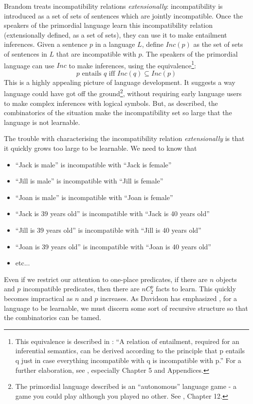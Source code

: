 Brandom treats incompatibility relations \emph{extensionally}: incompatibility is introduced as a set of sets of sentences which are jointly incompatible.
Once the speakers of the primordial language learn this incompatibility relation (extensionally defined, as a set of sets), they can use it to make entailment inferences.
Given a sentence $p$ in a language $L$, define $Inc(p)$ as the set of sets of sentences in $L$ that are incompatible with $p$.
The speakers of the primordial language can use $Inc$ to make inferences, using the equivalence\footnote{This equivalence is described in \cite{brandom2}: ``A relation of entailment, required for an inferential semantics, can be derived according to the principle that  p entails q just in case everything incompatible with q is incompatible with p.'' For a further elaboration, see \cite{brandom}, especially Chapter 5 and Appendices.}:
\[
p \mbox{ entails } q \mbox{ iff } Inc(q) \subseteq Inc(p)
\]
This is a highly appealing picture of language development.
It suggests a way language could have got off the ground\footnote{The primordial language described is  an ``autonomous'' language game - a game you could play although you played no other. See \cite{brandom3}, Chapter 12.}, without requiring early language users to make complex inferences with  logical symbols.
But, as described, the combinatorics of the situation make the incompatibility set so large that the language is not learnable.

The trouble with characterising the incompatibility relation \emph{extensionally} is that it quickly grows too large to be learnable. We need to know that
\begin{itemize}
\item
``Jack is male'' is incompatible with ``Jack is female''
\item
``Jill is male'' is incompatible with ``Jill is female''
\item
``Joan is male'' is incompatible with ``Joan is female''
\item
``Jack is 39 years old'' is incompatible with ``Jack is 40 years old''
\item
``Jill is 39 years old'' is incompatible with ``Jill is 40 years old''
\item
``Joan is 39 years old'' is incompatible with ``Joan is 40 years old''
\item
etc...
\end{itemize}
Even if we restrict our attention to one-place predicates, if there are $n$ objects and $p$ incompatible predicates, then there are $n C^p_2$ facts to learn. 
This quickly becomes impractical as $n$ and $p$ increases.
As Davidson has emphasized \cite{davidson}, for a language to be learnable, we must discern some sort of recursive structure so that the combinatorics can be tamed. 

